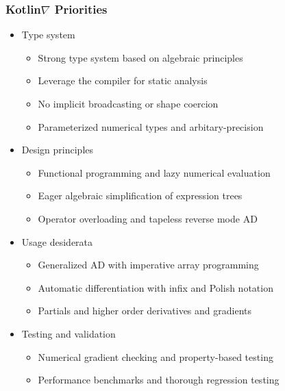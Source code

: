 \documentclass{beamer}
\begin{document}
    \begin{frame}
        \frametitle{Kotlin\texorpdfstring{$\nabla$}{} Priorities}
        \begin{itemize}
            \item Type system
            \begin{itemize}
                \item Strong type system based on algebraic principles
                \item Leverage the compiler for static analysis
                \item No implicit broadcasting or shape coercion
                \item Parameterized numerical types and arbitary-precision
            \end{itemize}
            \item Design principles
            \begin{itemize}
                \item Functional programming and lazy numerical evaluation
                \item Eager algebraic simplification of expression trees
                \item Operator overloading and tapeless reverse mode AD
            \end{itemize}
            \item Usage desiderata
            \begin{itemize}
                \item Generalized AD with imperative array programming
                \item Automatic differentiation with infix and Polish notation
                \item Partials and higher order derivatives and gradients
            \end{itemize}
            \item Testing and validation
            \begin{itemize}
                \item Numerical gradient checking and property-based testing
                \item Performance benchmarks and thorough regression testing
            \end{itemize}
        \end{itemize}
    \end{frame}
\end{document}

